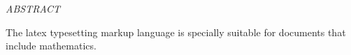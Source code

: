 \begin{center}
\normalfont\LARGE\textit{ABSTRACT}
\end{center}

The \Gls{latex} typesetting markup language is specially suitable for documents that include mathematics.

\newpage
